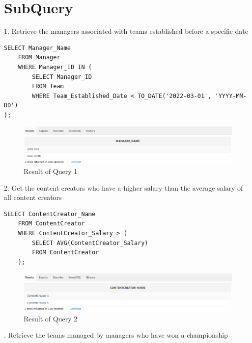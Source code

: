\section{SubQuery}
\hrulefill

1. Retrieve the managers associated with teams established before a specific date

\begin{lstlisting}[caption={ Query 1},label={lst:q-1}]
    SELECT Manager_Name
    FROM Manager
    WHERE Manager_ID IN (
        SELECT Manager_ID
        FROM Team
        WHERE Team_Established_Date < TO_DATE('2022-03-01', 'YYYY-MM-DD')
);
\end{lstlisting}

\begin{figure}[H]
    \centering
    \includegraphics[width=1\textwidth]{images/dml/Subq/q1.png}
    \caption{Result of Query 1}
\end{figure}
\vspace{2cm}
2. Get the content creators who have a higher salary than the average salary of all content creators

\begin{lstlisting}[caption={ Query 2},label={lst:q-2}]
    SELECT ContentCreator_Name
    FROM ContentCreator
    WHERE ContentCreator_Salary > (
        SELECT AVG(ContentCreator_Salary)
        FROM ContentCreator
    );    
\end{lstlisting}
\begin{figure}[H]
    \centering
    \includegraphics[width=1\textwidth]{images/dml/Subq/q2.png}
    \caption{Result of Query 2}
\end{figure}
. Retrieve the teams managed by managers who have won a championship


